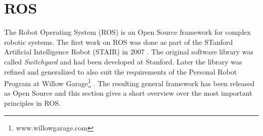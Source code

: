 \section{ROS}
The Robot Operating System (ROS) is an Open Source framework for complex robotic systems. The first work on ROS was done as part of the STanford Artificial Intelligence Robot (STAIR) in 2007 \cite{Quigley2007}. The original software library was called \emph{Switchyard} and had been developed at Stanford. Later the library was refined and generalized to also suit the requirements of the Personal Robot Program at Willow Garage\footnote{www.willowgarage.com} \cite{Quigley2009}. The resulting general framework has been released as Open Source \cite{Quigley2009} and this section gives a short overview over the most important principles in ROS.

\begin{figure}[ht]
\centering
{}
\end{figure}

